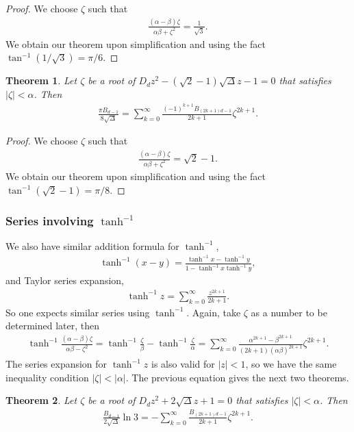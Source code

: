 \documentclass[12pt]{article}
\theoremstyle{plain}
\newtheorem{theorem}{Theorem}
\theoremstyle{definition}
\theoremstyle{remark}
\begin{document}
\begin{proof} We choose $ \zeta $ such that 
\begin{align*}
	\frac{(\alpha - \beta) \zeta}{\alpha \beta + \zeta^2} = \frac{1}{\sqrt{3}}.
\end{align*}
We obtain our theorem upon simplification and using the fact $ \tan^{-1} (1/\sqrt{3}) = \pi/6 $.
\end{proof}

\begin{theorem} Let $ \zeta $ be a root of $ D_d z^2 - (\sqrt{2} - 1) \sqrt{\Delta} z - 1 = 0 $ that satisfies $ |\zeta| < \alpha $. Then
\begin{align*}
	\frac{\pi B_{d - 1}}{8 \sqrt{\Delta}} = \sum_{k = 0}^\infty \frac{(-1)^{k + 1} B_{(2k + 1)d - 1}}{2k + 1} \zeta^{2k + 1}.
\end{align*}
\end{theorem}

\begin{proof} We choose $ \zeta $ such that 
\begin{align*}
	\frac{(\alpha - \beta) \zeta}{\alpha \beta + \zeta^2} = \sqrt{2} - 1.
\end{align*}
We obtain our theorem upon simplification and using the fact $ \tan^{-1} (\sqrt{2} - 1) = \pi/8 $.
\end{proof}

\subsubsection{Series involving \texorpdfstring{$ \tanh^{-1} $}{artanh}} \label{Sec:Series_Involving_artanh}

We also have similar addition formula for $ \tanh^{-1} $,
\begin{align*}
	\tanh^{-1} (x - y) = \frac{\tanh^{-1} x - \tanh^{-1} y}{1 - \tanh^{-1} x \tanh^{-1} y},
\end{align*}
and Taylor series expansion,
\begin{align*}
	\tanh^{-1} z = \sum_{k = 0}^\infty \frac{z^{2k + 1}}{2k + 1}.
\end{align*}
So one expects similar series using $ \tanh^{-1} $. Again, take $ \zeta $ as a number to be determined later, then 
\begin{align*}
\tanh^{-1} \frac{(\alpha - \beta) \zeta}{\alpha \beta - \zeta^2} = \tanh^{-1} \frac{\zeta}{\beta} - \tanh^{-1} \frac{\zeta}{\alpha} = \sum_{k = 0}^\infty \frac{\alpha^{2k + 1} - \beta^{2k + 1}}{(2k + 1) (\alpha \beta)^{2k + 1}} \zeta^{2k + 1}.
\end{align*}
The series expansion for $ \tanh^{-1} z $ is also valid for $ |z| < 1 $, so we have the same inequality condition $ |\zeta| < |\alpha| $. The previous equation gives the next two theorems. 
\begin{theorem} Let $ \zeta $ be a root of $ D_d z^2 + 2 \sqrt{\Delta} z + 1 = 0 $ that satisfies $ |\zeta| < \alpha $. Then
\begin{align*}
	\frac{B_{d - 1}}{2 \sqrt{\Delta}} \ln 3 = -\sum_{k = 0}^\infty \frac{B_{(2k + 1)d - 1}}{2k + 1} \zeta^{2k + 1}.
\end{align*}
\end{theorem}
\end{document}
